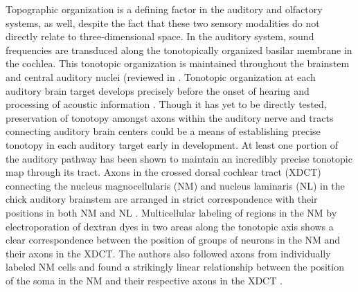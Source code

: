 Topographic organization is a defining factor in the auditory and olfactory systems, as well, despite the fact that these two sensory modalities do not directly relate to three-dimensional space.
In the auditory system, sound frequencies are transduced along the tonotopically organized basilar membrane in the cochlea.
This tonotopic organization is maintained throughout the brainstem and central auditory nuclei (reviewed in \cite{appler2011connecting}.
Tonotopic organization at each auditory brain target develops precisely before the onset of hearing and processing of acoustic information \cite{appler2011connecting,rubel2002auditory}. 
Though it has yet to be directly tested, preservation of tonotopy amongst axons within the auditory nerve and tracts connecting auditory brain centers could be a means of establishing precise tonotopy in each auditory target early in development.
At least one portion of the auditory pathway has been shown to maintain an incredibly precise tonotopic map through its tract. 
Axons in the crossed dorsal cochlear tract (XDCT) connecting the nucleus magnocellularis (NM) and nucleus laminaris (NL) in the chick auditory brainstem are arranged in strict correspondence with their positions in both NM and NL \cite{kashima2013pre}. 
Multicellular labeling of regions in the NM by electroporation of dextran dyes in two areas along the tonotopic axis shows a clear correspondence between the position of groups of neurons in the NM and their axons in the XDCT. 
The authors also followed axons from individually labeled NM cells and found a strikingly linear relationship between the position of the soma in the NM and their respective axons in the XDCT \cite{kashima2013pre}. 

